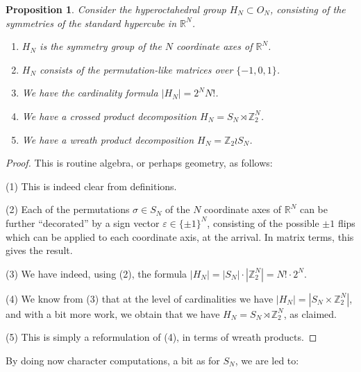 \documentclass[12pt]{amsbook}
\newtheorem{proposition}[theorem]{Proposition}
\begin{document}
\begin{proposition}
Consider the hyperoctahedral group $H_N\subset O_N$, consisting of the symmetries of the standard hypercube in $\mathbb R^N$.
\begin{enumerate}
\item $H_N$ is the symmetry group of the $N$ coordinate axes of $\mathbb R^N$.

\item $H_N$ consists of the permutation-like matrices over $\{-1,0,1\}$.

\item We have the cardinality formula $|H_N|=2^NN!$.

\item We have a crossed product decomposition $H_N=S_N\rtimes\mathbb Z_2^N$.

\item We have a wreath product decomposition $H_N=\mathbb Z_2\wr S_N$.
\end{enumerate} 
\end{proposition}

\begin{proof}
This is routine algebra, or perhaps geometry, as follows: 

\medskip

(1) This is indeed clear from definitions.

\medskip

(2) Each of the permutations $\sigma\in S_N$ of the $N$ coordinate axes of $\mathbb R^N$ can be further ``decorated'' by a sign vector $\varepsilon\in\{\pm1\}^N$, consisting of the possible $\pm1$ flips which can be applied to each coordinate axis, at the arrival. In matrix terms, this gives the result.

\medskip

(3) We have indeed, using (2), the formula $|H_N|
=|S_N|\cdot|\mathbb Z_2^N|
=N!\cdot2^N$.

\medskip

(4) We know from (3) that at the level of cardinalities we have $|H_N|=|S_N\times\mathbb Z_2^N|$, and with a bit more work, we obtain that we have $H_N=S_N\rtimes\mathbb Z_2^N$, as claimed.

\medskip

(5) This is simply a reformulation of (4), in terms of wreath products.
\end{proof}

By doing now character computations, a bit as for $S_N$, we are led to:

\end{document}
